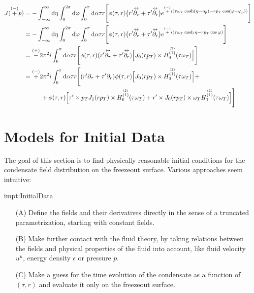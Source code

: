\begin{subequations}
    \begin{align}
        J(\overset{(-)}{+}p) & =-\int_{-\infty}^\infty\text{d}\eta\int_0^{2\pi}\text{d}\varphi\int_0^\pi\text{d}\alpha\tau r\Bigg[\phi(\tau,r)\big(r^\prime\overset{\leftrightarrow}{\partial_\tau}+\tau^\prime\overset{\leftrightarrow}{\partial_r}\big)e^{\overset{(-)}{+}{i}(\tau \omega_T\cosh(\eta-\eta_p)-r p_T\cos(\varphi-\varphi_p))}\Bigg] \\
                           & =-\int_{-\infty}^\infty\text{d}\eta\int_0^{2\pi}\text{d}\varphi\int_0^\pi\text{d}\alpha\tau r\Bigg[\phi(\tau,r)\big(r^\prime\overset{\leftrightarrow}{\partial_\tau}+\tau^\prime\overset{\leftrightarrow}{\partial_r}\big)e^{\overset{(-)}{+}{i}(\tau \omega_T\cosh\eta-r p_T\cos\varphi)}\Bigg]                      \\
                           & =\overset{(+)}{-}2\pi^2{i}\int_0^\pi\text{d}\alpha\tau r\Bigg[\phi(\tau,r)(r^\prime\overset{\leftrightarrow}{\partial_\tau}+\tau^\prime\overset{\leftrightarrow}{\partial_r})\Big[J_0(r p_T)\times H_0^{\overset{(2)}{(1)}}(\tau\omega_T)\Big]\Bigg]                                                 \\
                           & =\overset{(-)}{+}2\pi^2{i}\int_0^\pi\text{d}\alpha\tau r\Bigg[(r^\prime\partial_\tau+\tau^\prime\partial_r)\phi(\tau,r)\Big[J_0(r p_T)\times H_0^{\overset{(2)}{(1)}}(\tau\omega_T)\Big]+\nonumber                                                                                             \\
                           & \phantom{=}\qquad + \phi(\tau,r)\Big[\tau^\prime\times p_T J_1(r p_T)\times H_0^{\overset{(2)}{(1)}}(\tau\omega_T)+r^\prime\times J_0(r p_T)\times\omega_T H_1^{\overset{(2)}{(1)}}(\tau\omega_T)\Big]\Bigg]
    \end{align}
\end{subequations}



\section{Models for Initial Data}

The goal of this section is to find physically reasonable initial conditions for the condensate field distribution on the freezeout surface. Various approaches seem intuitive:
\begin{impt}{impt:InitialData}
    \begin{enumerate}
        \item[(A)] Define the fields and their derivatives directly in the sense of a truncated parametrization, starting with constant fields.
        \item[(B)] Make further contact with the fluid theory, by taking relations between the fields and physical properties of the fluid into account, like fluid velocity $u^\mu$, energy density $\epsilon$ or pressure $p$.
        \item[(C)] Make a guess for the time evolution of the condensate as a function of ${(\tau,r)}$ and evaluate it only on the freezeout surface.
    \end{enumerate}
\end{impt}

